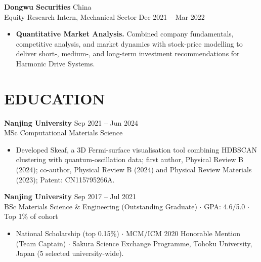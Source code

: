 \documentclass[a4paper,10pt]{article}
\begin{document}
\vspace{2pt}
\noindent\textbf{Dongwu Securities} \hfill China\\
Equity Research Intern, Mechanical Sector \hfill Dec 2021 -- Mar 2022
\begin{itemize}
    \item \textbf{Quantitative Market Analysis.} Combined company fundamentals, competitive analysis, and market dynamics with stock-price modelling to deliver short-, medium-, and long-term investment recommendations for Harmonic Drive Systems.
\end{itemize}

\section{EDUCATION}
\noindent\textbf{Nanjing University} \hfill Sep 2021 -- Jun 2024\\
MSc Computational Materials Science
\begin{itemize}
    \item Developed Skeaf, a 3D Fermi-surface visualisation tool combining HDBSCAN clustering with quantum-oscillation data; first author, Physical Review B (2024); co-author, Physical Review B (2024) and Physical Review Materials (2023); Patent: CN115795266A.
\end{itemize}
\vspace{2pt}
\noindent\textbf{Nanjing University} \hfill Sep 2017 -- Jul 2021\\
BSc Materials Science \& Engineering (Outstanding Graduate) \;$\cdot$\; GPA: 4.6/5.0 \;$\cdot$\; Top 1\% of cohort
\begin{itemize}
    \item National Scholarship (top 0.15\%) \;$\cdot$\; MCM/ICM 2020 Honorable Mention (Team Captain) \;$\cdot$\; Sakura Science Exchange Programme, Tohoku University, Japan (5 selected university-wide).
\end{itemize}
\end{document}
